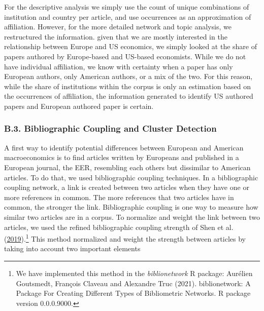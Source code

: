 \documentclass[
  12pt,
  onecolumn]{article}
\begin{document}
For the descriptive analysis we simply use the count of unique
combinations of institution and country per article, and use occurrences
as an approximation of affiliation. However, for the more detailed
network and topic analysis, we restructured the information. given that
we are mostly interested in the relationship between Europe and US
economics, we simply looked at the share of papers authored by
Europe-based and US-based economists. While we do not have individual
affiliation, we know with certainty when a paper has only European
authors, only American authors, or a mix of the two. For this reason,
while the share of institutions within the corpus is only an estimation
based on the occurrences of affiliation, the information generated to
identify US authored papers and European authored paper is certain.

\hypertarget{network}{%
\subsubsection*{B.3. Bibliographic Coupling and Cluster
Detection}\label{network}}

A first way to identify potential differences between European and
American macroeconomics is to find articles written by Europeans and
published in a European journal, the EER, resembling each others but
dissimilar to American articles. To do that, we used bibliographic
coupling techniques. In a bibliographic coupling network, a link is
created between two articles when they have one or more references in
common. The more references that two articles have in common, the
stronger the link. Bibliographic coupling is one way to measure how
similar two articles are in a corpus. To normalize and weight the link
between two articles, we used the refined bibliographic coupling
strength of Shen et al.
(\protect\hyperlink{ref-shen2019}{2019}).\footnote{We have implemented
  this method in the \emph{biblionetwork} R package: Aurélien Goutsmedt,
  François Claveau and Alexandre Truc (2021). biblionetwork: A Package
  For Creating Different Types of Bibliometric Networks. R package
  version 0.0.0.9000.} This method normalized and weight the strength
between articles by taking into account two important elements
\end{document}
